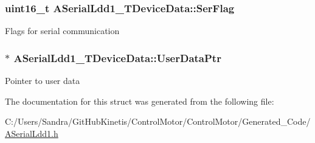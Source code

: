 \subsubsection[{\texorpdfstring{Ser\+Flag}{SerFlag}}]{\setlength{\rightskip}{0pt plus 5cm}uint16\+\_\+t A\+Serial\+Ldd1\+\_\+\+T\+Device\+Data\+::\+Ser\+Flag}\hypertarget{struct_a_serial_ldd1___t_device_data_affb5a6a3a2d0c0dc54c04a66b2e1ada0}{}\label{struct_a_serial_ldd1___t_device_data_affb5a6a3a2d0c0dc54c04a66b2e1ada0}
Flags for serial communication 
\subsubsection[{\texorpdfstring{User\+Data\+Ptr}{UserDataPtr}}]{$\ast$ A\+Serial\+Ldd1\+\_\+\+T\+Device\+Data\+::\+User\+Data\+Ptr}\hypertarget{struct_a_serial_ldd1___t_device_data_a7fed00148f2be816d5e81f693ced1df7}{}\label{struct_a_serial_ldd1___t_device_data_a7fed00148f2be816d5e81f693ced1df7}
Pointer to user data 

The documentation for this struct was generated from the following file\+:\begin{DoxyCompactItemize}
\item 
C\+:/\+Users/\+Sandra/\+Git\+Hub\+Kinetis/\+Control\+Motor/\+Control\+Motor/\+Generated\+\_\+\+Code/\hyperlink{_a_serial_ldd1_8h}{A\+Serial\+Ldd1.\+h}\end{DoxyCompactItemize}
